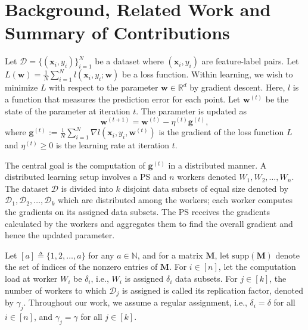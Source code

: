 \documentclass[journal,draftcls,onecolumn]{IEEEtran}
\theoremstyle{mystyle}
\newcommand{\bfM}{\mathbf{M}}
\newcommand{\sifat}[1]{\marginpar{+}{\bf Sifat's remark}: {\em #1}}
\begin{document}
\section{Background, Related Work and Summary of Contributions}
\label{sec:bground}
Let $\mathcal{D} = \{ (\mathbf{x}_i , y_i )\}_{i = 1}^N$ be a dataset where $(\mathbf{x}_i, y_i)$ are feature-label pairs. Let $L(\mathbf{w}) = \frac{1}{N} \sum_{i = 1}^N l(\mathbf{x}_i, y_i; \mathbf{w})$ be a loss function. Within learning, we wish to minimize $L$ with respect to the parameter $\mathbf{w} \in \mathbb{R}^d$ by gradient descent. Here, $l$ is a function that measures the prediction error for each point. Let $\mathbf{w}^{(t)}$ be the state of the parameter at iteration $t$. The parameter is updated as
\[ \mathbf{w}^{(t+1)} = \mathbf{w}^{(t)} - \eta^{(t)}\mathbf{g}^{(t)}, \]
where $\mathbf{g}^{(t)} := \frac{1}{N} \sum_{i = 1}^N \nabla l(\mathbf{x}_i, y_i, \mathbf{w}^{(t)})$ is the gradient of the loss function $L$ and $\eta^{(t)} \geq 0$ is the learning rate at iteration $t$.

The central goal is the computation of $\mathbf{g}^{(t)}$ in a distributed manner.
A distributed learning setup involves a PS and $n$ workers denoted $W_1, W_2, \dots, W_n$. The dataset $\mathcal{D}$ is divided into $k$ disjoint data subsets of equal size denoted by $\mathcal{D}_1, \mathcal{D}_2, \dots, \mathcal{D}_k$ which are distributed among the workers; each worker computes the gradients on its assigned data subsets. The PS receives the gradients calculated by the workers and aggregates them to find the overall gradient and hence the updated parameter.


Let $[a] \triangleq \{1,2, \dots, a\}$ for any $a \in \mathbb{N}$, and for a matrix $\bfM$, let $\text{supp}(\bfM)$ denote the set of indices of the nonzero entries of $\bfM$. %
For $i \in [n]$, let the computation load at worker $W_i$ be $\delta_i$, i.e., $W_i$ is assigned $\delta_i$ data subsets. For $j \in [k]$, the number of workers to which $\mathcal{D}_j$ is assigned is called its replication factor, denoted by $\gamma_j$. Throughout our work, we assume a regular assignment, i.e., $\delta_i = \delta$ for all $i \in [n]$, and $\gamma_j = \gamma$  for all $j \in [k]$. %
\end{document}
